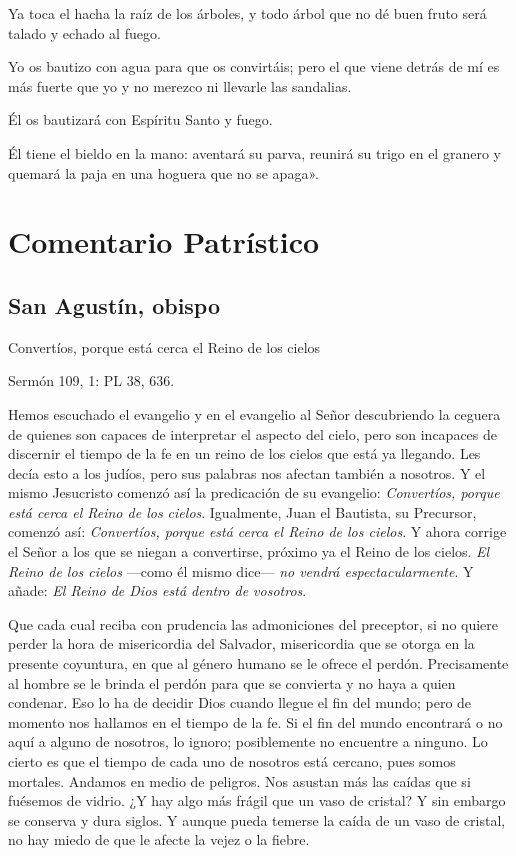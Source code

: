 \begin{body}
Ya toca el hacha la raíz de los árboles, y todo árbol que no dé buen
fruto será talado y echado al fuego.

Yo os bautizo con agua para que os convirtáis; pero el que viene detrás
de mí es más fuerte que yo y no merezco ni llevarle las sandalias.

Él os bautizará con Espíritu Santo y fuego.

Él tiene el bieldo en la mano: aventará su parva, reunirá su trigo en el
granero y quemará la paja en una hoguera que no se
apaga».

\section{Comentario Patrístico}



\subsection{San Agustín, obispo}

Convertíos, porque está cerca el Reino de los cielos

Sermón 109, 1: PL 38, 636.

Hemos escuchado el evangelio y en el evangelio al Señor descubriendo la ceguera de quienes son capaces de interpretar el aspecto del cielo, pero son incapaces de discernir el tiempo de la fe en un reino de los cielos que está ya llegando. Les decía esto a los judíos, pero sus palabras nos afectan también a nosotros. Y el mismo Jesucristo comenzó así la predicación de su evangelio: \emph{Convertíos, porque está cerca el Reino de los cielos}. Igualmente, Juan el Bautista, su Precursor, comenzó así: \emph{Convertíos, porque está cerca el Reino de los cielos}. Y ahora corrige el Señor a los que se niegan a convertirse, próximo ya el Reino de los cielos. \emph{El Reino de los cielos} ---como él mismo dice--- \emph{no vendrá espectacularmente}. Y añade: \emph{El Reino de Dios está dentro de vosotros}.

Que cada cual reciba con prudencia las admoniciones del preceptor, si no quiere perder la hora de misericordia del Salvador, misericordia que se otorga en la presente coyuntura, en que al género humano se le ofrece el perdón. Precisamente al hombre se le brinda el perdón para que se convierta y no haya a quien condenar. Eso lo ha de decidir Dios cuando llegue el fin del mundo; pero de momento nos hallamos en el tiempo de la fe. Si el fin del mundo encontrará o no aquí a alguno de nosotros, lo ignoro; posiblemente no encuentre a ninguno. Lo cierto es que el tiempo de cada uno de nosotros está cercano, pues somos mortales. Andamos en medio de peligros. Nos asustan más las caídas que si fuésemos de vidrio. ¿Y hay algo más frágil que un vaso de cristal? Y sin embargo se conserva y dura siglos. Y aunque pueda temerse la caída de un vaso de cristal, no hay miedo de que le afecte la vejez o la fiebre.


\end{body}
